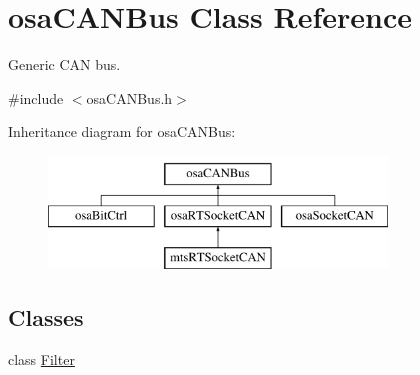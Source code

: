 \hypertarget{classosa_c_a_n_bus}{\section{osa\-C\-A\-N\-Bus Class Reference}
\label{classosa_c_a_n_bus}
}


Generic C\-A\-N bus.  




{\ttfamily \#include $<$osa\-C\-A\-N\-Bus.\-h$>$}

Inheritance diagram for osa\-C\-A\-N\-Bus\-:\begin{figure}[H]
\begin{center}
\leavevmode
\includegraphics[height=3.000000cm]{de/dbc/classosa_c_a_n_bus}
\end{center}
\end{figure}
\subsection*{Classes}
\begin{DoxyCompactItemize}
\item 
class \hyperlink{classosa_c_a_n_bus_1_1_filter}{Filter}
\end{DoxyCompactItemize}
